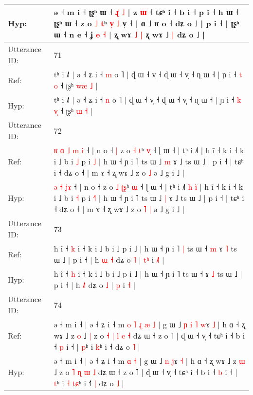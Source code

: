 \documentclass[10pt]{article}
\DeclareRobustCommand{\hl}[1]{{\textcolor{red}{#1}}}
\begin{document}
\begin{longtable}{ll}
 \\
Hyp: & ə ˧ m i ˧\hl{}\hl{} ʈʂʰ ɯ ˧\hl{ }\hl{ɻ}\hl{̍}\hl{ }\hl{˩} | z \hl{ɯ} ˧ tɕʰ i ˧ b i ˧ p i ˧\hl{}\hl{} h ɯ ˧\hl{}\hl{}\hl{}\hl{}\hl{}\hl{}\hl{}\hl{}\hl{}\hl{} ʈʂʰ ɯ ˧\hl{}\hl{} z o \hl{˩} \hl{}\hl{t}ʰ \hl{v}\hl{̩} \hl{˩} v̩ ˧ | ɑ ˩ ʁ o ˧ dʑ o ˩ | p i ˧ | ʈʂʰ ɯ ˧ n e ˧ ʝ \hl{e} \hl{˧} | ʐ wɤ\hl{ }\hl{˩} \hl{|} ʐ wɤ ˩\hl{ }\hl{|} dʑ o ˩ |
 \\
\midrule
Utterance ID: & 71 \\
Ref: & tʰ i ˩˥ | ə ˧ ʑ i ˧ \hl{m} o ˥ | ɖ ɯ ˧ v̩ ˧ ɖ ɯ ˧ v̩ ˧ ɳ ɯ ˧ | ɲ i ˧ \hl{t} \hl{}\hl{o} ˧ ʈʂʰ \hl{w}\hl{æ} \hl{˩} |
 \\
Hyp: & tʰ i ˩˥ | ə ˧ ʑ i ˧ \hl{n} o ˥ | ɖ ɯ ˧ v̩ ˧ ɖ ɯ ˧ v̩ ˧ ɳ ɯ ˧ | ɲ i ˧ \hl{k} \hl{v}\hl{̩} ˧ ʈʂʰ \hl{}\hl{ɯ} \hl{˧} |
 \\
\midrule
Utterance ID: & 72 \\
Ref: & \hl{ʁ}\hl{ }\hl{ɑ} \hl{˩} \hl{m}\hl{ }\hl{i} ˧ | n o ˧\hl{ }\hl{|} z o \hl{˧} \hl{}\hl{t}ʰ \hl{v}\hl{̩} ˧ ɭ ɯ ˧ | tʰ i ˩˥\hl{}\hl{}\hl{}\hl{}\hl{} | h ĩ ˧ k i ˧ k i ˩ b i \hl{˩} p i \hl{}\hl{˩} | h ɯ ˧ ɲ i ˥ ts ɯ ˩ \hl{m} ɤ ˩ ts ɯ ˩ | p i ˧ | tɕʰ i ˧ dʑ o ˧ | m ɤ ˧ ʐ wɤ ˩ z o\hl{}\hl{} \hl{˩} ə ˩ g i ˩ |
 \\
Hyp: & \hl{}\hl{}\hl{ə} \hl{˧} \hl{}\hl{j}\hl{ɤ} ˧ | n o ˧\hl{}\hl{} z o \hl{˩} \hl{ʈ}\hl{ʂ}ʰ \hl{}\hl{ɯ} ˧ ɭ ɯ ˧ | tʰ i ˩˥\hl{ }\hl{h}\hl{ }\hl{i}\hl{̃} | h ĩ ˧ k i ˧ k i ˩ b i \hl{˧} p i \hl{˧}\hl{˥} | h ɯ ˧ ɲ i ˥ ts ɯ ˩ \hl{|} ɤ ˩ ts ɯ ˩ | p i ˧ | tɕʰ i ˧ dʑ o ˧ | m ɤ ˧ ʐ wɤ ˩ z o\hl{ }\hl{˥} \hl{|} ə ˩ g i ˩ |
 \\
\midrule
Utterance ID: & 73 \\
Ref: & h ĩ ˧ \hl{k} i ˧ k i ˩ b i ˩ p i ˩ | h ɯ ˧ ɲ i ˥\hl{ }\hl{|} ts ɯ ˧\hl{ }\hl{m} ɤ \hl{˥} ts ɯ ˩ | p i ˧ | h \hl{ɯ}\hl{ }\hl{˧} dʑ o \hl{˥} | \hl{t}\hl{ʰ} i \hl{˩}\hl{˥} |
 \\
Hyp: & h ĩ ˧ \hl{h} i ˧ k i ˩ b i ˩ p i ˩ | h ɯ ˧ ɲ i ˥\hl{}\hl{} ts ɯ ˧\hl{}\hl{} ɤ \hl{˩} ts ɯ ˩ | p i ˧ | h \hl{}\hl{˩}\hl{˥} dʑ o \hl{˩} | \hl{}\hl{p} i \hl{}\hl{˧} |
 \\
\midrule
Utterance ID: & 74 \\
Ref: & ə ˧ m i ˧ | ə ˧ ʑ i ˧ m\hl{ }\hl{o}\hl{ }\hl{˥}\hl{ }\hl{ɻ} \hl{æ} \hl{˩} | g ɯ ˩\hl{ }\hl{ɲ}\hl{ }\hl{i} \hl{˥} \hl{w}ɤ \hl{˩} | h ɑ ˧ ʐ wɤ ˩ z \hl{o} ˩\hl{ }\hl{|} z o\hl{ }\hl{˧} \hl{|} \hl{l} \hl{e} \hl{˧} dʑ ɯ ˧ z o ˥ | ɖ ɯ ˧ v̩ ˧ tɕʰ i ˧ b i ˧ \hl{p} i ˧ | \hl{p}ʰ i\hl{}\hl{} \hl{}\hl{k}ʰ i ˧\hl{}\hl{}\hl{} dʑ o \hl{˥} |
 \\
Hyp: & ə ˧ m i ˧ | ə ˧ ʑ i ˧ m\hl{}\hl{}\hl{}\hl{}\hl{}\hl{} \hl{ɑ} \hl{˧} | g ɯ ˩\hl{}\hl{}\hl{}\hl{} \hl{n} \hl{j}ɤ \hl{˧} | h ɑ ˧ ʐ wɤ ˩ z \hl{ɯ} ˩\hl{}\hl{} z o\hl{}\hl{} \hl{˥} \hl{ɳ} \hl{ɯ} \hl{˩} dʑ ɯ ˧ z o ˥ | ɖ ɯ ˧ v̩ ˧ tɕʰ i ˧ b i ˧ \hl{b} i ˧ | \hl{t}ʰ i\hl{ }\hl{˧} \hl{t}\hl{ɕ}ʰ i ˧\hl{˥}\hl{ }\hl{|} dʑ o \hl{˩} |

\end{longtable}
\end{document}
